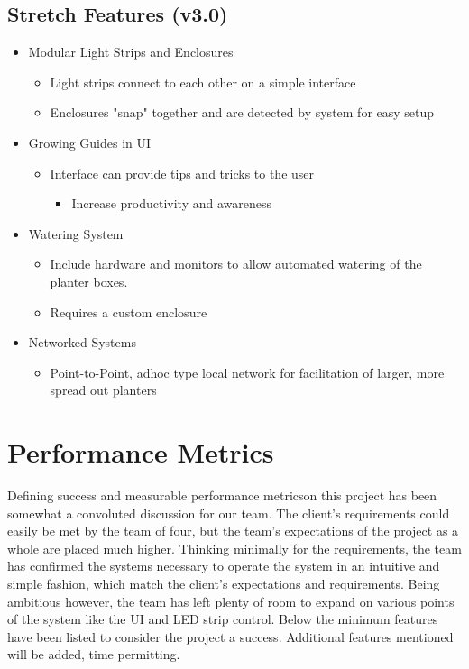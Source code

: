 \documentclass[letterpaper,10pt,draftclsnofoot,onecolumn]{article}
\begin{document}
	\subsection*{Stretch Features (v3.0)}
	\begin{itemize}

		\item Modular Light Strips and Enclosures
		\begin{itemize}
			\item Light strips connect to each other on a simple interface
			\item Enclosures "snap" together and are detected by system for easy setup
		\end{itemize}

		\item Growing Guides in UI
		\begin{itemize}
			\item Interface can provide tips and tricks to the user
			\begin{itemize}
				\item Increase productivity and awareness
			\end{itemize}
		\end{itemize}

		\item Watering System
		\begin{itemize}
			\item Include hardware and monitors to allow automated watering of the planter boxes.
			\item Requires a custom enclosure
		\end{itemize}
		
		\item Networked Systems
		\begin{itemize}
			\item Point-to-Point, adhoc type local network for facilitation of larger, more spread out planters
		\end{itemize}

	\end{itemize}


	\section*{Performance Metrics}
	Defining success and measurable performance metricson this project has been somewhat a convoluted discussion for our team.  The client's requirements could easily be met by the team of four, but the team's expectations of the project as a whole are placed much higher.  Thinking minimally for the requirements, the team has confirmed the systems necessary to operate the system in an intuitive and simple fashion, which match the client's expectations and requirements.  Being ambitious however, the team has left plenty of room to expand on various points of the system like the UI and LED strip control.  Below the minimum features have been listed to consider the project a success.  Additional features mentioned will be added, time permitting.  
\end{document}

